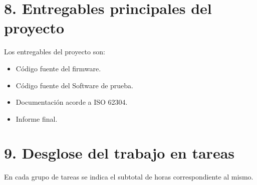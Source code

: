 \documentclass[
11pt, %
codirector, %
]{charter}
\begin{document}
%
%

\section{8. Entregables principales del proyecto}
\label{sec:entregables}

Los entregables del proyecto son:

\begin{itemize}
	\item Código fuente del firmware.
	\item Código fuente del Software de prueba.
	\item Documentación acorde a ISO 62304.
	\item Informe final.
\end{itemize}

\section{9. Desglose del trabajo en tareas}
\label{sec:wbs}

En cada grupo de tareas se indica el subtotal de horas correspondiente al mismo.
\end{document}
